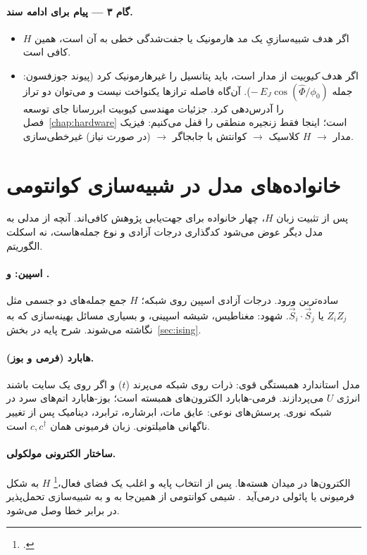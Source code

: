 \paragraph{گام ۳ --- پیام برای ادامه سند.}
\begin{itemize}
	\item اگر هدف شبیه‌سازیِ یک مد هارمونیک یا جفت‌شدگی خطی به آن است، همین $H$ کافی است.
	\item اگر هدف \emph{کیوبیت} از مدار است، باید پتانسیل را غیرهارمونیک کرد (پیوند جوزفسون: جمله $-\,E_J\cos(\hat\Phi/\phi_0)$). آن‌گاه فاصله ترازها یکنواخت نیست و می‌توان دو تراز را آدرس‌دهی کرد. جزئیات مهندسی کیوبیت ابررسانا جای توسعه فصل~\ref{chap:hardware} است؛ اینجا فقط زنجیره منطقی را قفل می‌کنیم: فیزیک مدار $\to$ $H$ کلاسیک $\to$ کوانتش با جابجاگر $\to$ (در صورت نیاز) غیرخطی‌سازی.
\end{itemize}

\section{خانواده‌های مدل در شبیه‌سازی کوانتومی}

پس از تثبیت زبان $H$، چهار خانواده برای جهت‌یابی پژوهش کافی‌اند. آنچه از مدلی به مدل دیگر عوض می‌شود کدگذاری درجات آزادی و نوع جمله‌هاست، نه اسکلت الگوریتم.

\paragraph{اسپین:  و .}
ساده‌ترین ورود. درجات آزادی اسپین روی شبکه؛ $H$ جمع جمله‌های دو جسمی مثل $Z_i Z_j$ یا $\vec{S}_i\cdot\vec{S}_j$. شهود: مغناطیس، شیشه اسپینی، و بسیاری مسائل بهینه‌سازی که به  نگاشته می‌شوند. شرح پایه در بخش~\ref{sec:ising}.

\paragraph{هابارد (فرمی و بوز).}
مدل استاندارد همبستگی قوی: ذرات روی شبکه می‌پرند ($t$) و اگر روی یک سایت باشند انرژی $U$ می‌پردازند. فرمی-هابارد الکترون‌های همبسته است؛ بوز-هابارد اتم‌های سرد در شبکه نوری. پرسش‌های نوعی: عایق مات، ابرشاره، ترابرد، دینامیک پس از تغییر ناگهانی هامیلتونی. زبان فرمیونی همان $c,c^\dagger$ است.

\paragraph{ساختار الکترونی مولکولی.}
الکترون‌ها در میدان هسته‌ها. پس از انتخاب پایه و اغلب یک فضای فعال،\footnote{.} $H$ به شکل فرمیونی یا پائولی درمی‌آید~\cite{McArdle2020,Bauer2020}. شیمی کوانتومی از همین‌جا به  و به شبیه‌سازی تحمل‌پذیر در برابر خطا وصل می‌شود.


